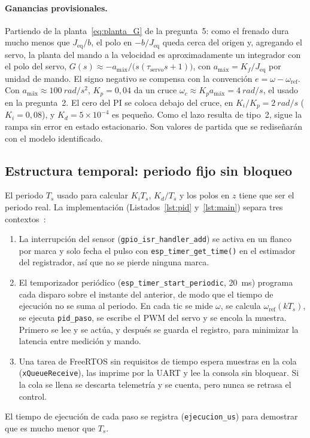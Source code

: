 \paragraph{Ganancias provisionales.}
Partiendo de la planta~\eqref{eq:planta_G} de la pregunta~5: como el frenado dura mucho menos
que $J_\text{eq}/b$, el polo en $-b/J_\text{eq}$ queda cerca del origen y, agregando el servo,
la planta del mando a la velocidad es aproximadamente un integrador con el polo del servo,
$G(s)\approx -a_\text{máx}/\big(s(\tau_\text{servo}s+1)\big)$, con $a_\text{máx}=K_f/J_\text{eq}$
por unidad de mando. El signo
negativo se compensa con la convención $e=\omega-\omega_\text{ref}$. Con
$a_\text{máx}\approx\SI{100}{rad/s^2}$, $K_p=0{,}04$ da un cruce
$\omega_c\approx K_p a_\text{máx}=\SI{4}{rad/s}$, el usado en la pregunta~2. El cero del PI se
coloca debajo del cruce, en $K_i/K_p=\SI{2}{rad/s}$ ($K_i=0{,}08$), y $K_d=5\times10^{-4}$ es
pequeño. Como el lazo resulta de tipo~2, sigue la rampa sin error en estado estacionario. Son
valores de partida que se rediseñarán con el modelo identificado.

\subsection{Estructura temporal: periodo fijo sin bloqueo}
El periodo $T_s$ usado para calcular $K_iT_s$, $K_d/T_s$ y los polos en $z$ tiene que ser el
periodo real. La implementación (Listados~\ref{lst:pid} y~\ref{lst:main}) separa tres
contextos~\cite{espidf}:
\begin{enumerate}
  \item La interrupción del sensor (\texttt{gpio\_isr\_handler\_add}) se activa en un flanco por
  marca y solo fecha el pulso con \texttt{esp\_timer\_get\_time()} en el estimador del
  registrador, así que no se pierde ninguna marca.
  \item El temporizador periódico (\texttt{esp\_timer\_start\_periodic}, 20~ms) programa cada
  disparo sobre el instante del anterior, de modo que el tiempo de ejecución no se suma al periodo. En cada tic se mide
  $\omega$, se calcula $\omega_\text{ref}(kT_s)$, se ejecuta \texttt{pid\_paso}, se escribe el
  PWM del servo y se encola la muestra. Primero se lee y se actúa, y después se guarda el
  registro, para minimizar la latencia entre medición y mando.
  \item Una tarea de FreeRTOS sin requisitos de tiempo espera muestras en la cola
  (\texttt{xQueueReceive}), las imprime por la UART y lee la consola sin bloquear. Si la cola se
  llena se descarta telemetría y se cuenta, pero nunca se retrasa el control.
\end{enumerate}
El tiempo de ejecución de cada paso se registra (\texttt{ejecucion\_us}) para demostrar que es
mucho menor que $T_s$.


